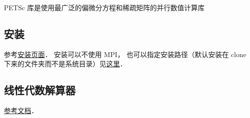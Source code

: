 
\begin{issues}
\issueDraft
\end{issues}

PETSc 库是使用最广泛的偏微分方程和稀疏矩阵的并行数值计算库

\subsection{安装}
参考\href{https://petsc.org/release/install/install_tutorial/}{安装页面}．
安装可以不使用 MPI， 也可以指定安装路径（默认安装在 clone 下来的文件夹而不是系统目录）见\href{https://petsc.org/release/install/install/#mpi-problems-i-don-t-want-mpi}{这里}．

\subsection{线性代数解算器}
\href{https://petsc.org/release/docs/manual/ksp/}{参考文档}．
